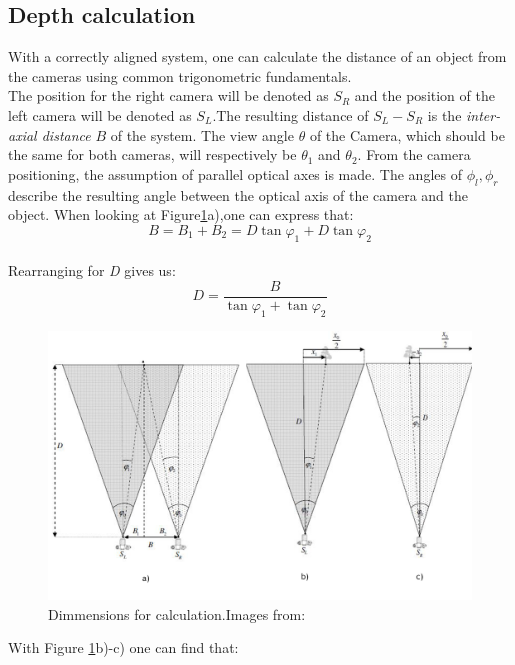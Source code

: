\subsection{Depth calculation}
With a correctly aligned system, one can calculate the distance of an object from the cameras using common trigonometric fundamentals\cite{JernejMrovlje.2008,YasirDawoodSalman.2017}.
\\
The position for the right camera will be denoted as $S_{R}$ and the position of the left camera will be denoted as $S_{L}$.The resulting distance of $S_{L}-S_{R}$ is the \textit{inter-axial distance} $B$ of the system. The view angle $\theta$ of the Camera, which should be the same for both cameras, will respectively be $\theta_{1}$ and $\theta_{2}$. From the camera positioning, the assumption of parallel optical axes is made. The angles of $\phi_{l},\phi_{r}$ describe the resulting angle between the optical axis of the camera and the object.
When looking at Figure\ref{stereo_Dimmensions}a),one can express that:\\
\begin{equation}
B= B_{1}+B_{2}=D\tan\varphi_{1}+D\tan\varphi_{2}
\end{equation}\\
Rearranging for \textit{D} gives us:\\
\begin{equation}
D = \frac{B}{\tan\varphi_{1}+\tan\varphi_{2}}
\end{equation}
\begin{figure}[H]
\includegraphics[width=\textwidth]{images/Stereo_Calc_4.JPG}
\caption{Dimmensions for calculation.Images from:\cite{JernejMrovlje.2008}}
\label{stereo_Dimmensions} 
\end{figure}
With Figure \ref{stereo_Dimmensions}b)-c) one can find that:
